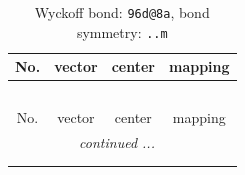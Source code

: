 \documentclass[fleqn,8pt]{jsarticle}
\begin{document}
\renewcommand{\arraystretch}{1.2}
\begin{longtable}{cccc}
\caption{Wyckoff bond: {\tt 96d@8a}, bond symmetry: {\tt ..m}}
 \\
 \hline \hline
No. & vector & center & mapping \\ \hline \endfirsthead

\multicolumn{3}{l}{\tablename\ \thetable{}} \\
 \hline \hline
No. & vector & center & mapping \\ \hline \endhead

 \hline \hline
\multicolumn{3}{r}{\footnotesize\it continued ...} \\ \endfoot

 \hline \hline
\multicolumn{3}{r}{} \\ \endlastfoot


\end{longtable}
\end{document}
